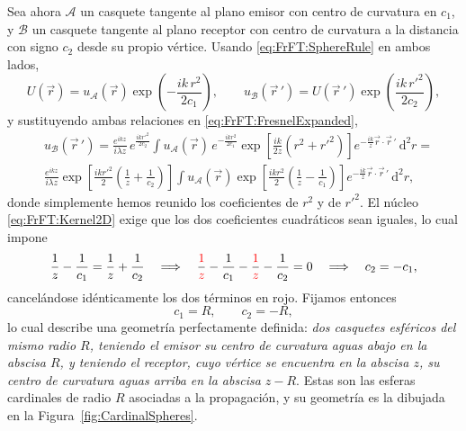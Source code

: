 			Sea ahora $\mathcal{A}$ un casquete tangente al plano emisor con centro de curvatura en $c_{1}$, y $\mathcal{B}$ un casquete tangente al plano receptor con centro de curvatura a la distancia con signo $c_{2}$ desde su propio vértice. Usando \eqref{eq:FrFT:SphereRule} en ambos lados,
			\begin{equation}\label{eq:FrFT:Referring}
				U(\vec{r}) = u_{\mathcal{A}}(\vec{r})\exp\left(-\frac{ik\,r^{2}}{2c_{1}}\right), \qquad u_{\mathcal{B}}(\vec{r}\,') = U(\vec{r}\,')\exp\left(\frac{ik\,r'^{2}}{2c_{2}}\right),
			\end{equation}
			y sustituyendo ambas relaciones en \eqref{eq:FrFT:FresnelExpanded},
			\begin{align*}
				& u_{\mathcal{B}}(\vec{r}\,') = \frac{e^{ikz}}{i\lambda z}\,e^{\frac{ikr'^{2}}{2c_{2}}}\int u_{\mathcal{A}}(\vec{r})\,e^{-\frac{ikr^{2}}{2c_{1}}}\exp\left[\frac{ik}{2z}\left(r^{2}+r'^{2}\right)\right]e^{-\frac{ik}{z}\vec{r}\cdot\vec{r}\,'}\,\mathrm{d}^{2}r = \\
				& \frac{e^{ikz}}{i\lambda z}\exp\left[\frac{ikr'^{2}}{2}\left(\frac{1}{z}+\frac{1}{c_{2}}\right)\right]\int u_{\mathcal{A}}(\vec{r})\exp\left[\frac{ikr^{2}}{2}\left(\frac{1}{z}-\frac{1}{c_{1}}\right)\right]e^{-\frac{ik}{z}\vec{r}\cdot\vec{r}\,'}\,\mathrm{d}^{2}r,
			\end{align*}
			donde simplemente hemos reunido los coeficientes de $r^{2}$ y de $r'^{2}$. El núcleo \eqref{eq:FrFT:Kernel2D} exige que los dos coeficientes cuadráticos sean iguales, lo cual impone
			\begin{equation}\label{eq:FrFT:CardinalCondition}
				\frac{1}{z}-\frac{1}{c_{1}} = \frac{1}{z}+\frac{1}{c_{2}} \quad\Longrightarrow\quad \frac{{\color{red}1}}{{\color{red}z}}-\frac{1}{c_{1}}-\frac{{\color{red}1}}{{\color{red}z}}-\frac{1}{c_{2}}=0 \quad\Longrightarrow\quad c_{2} = -c_{1},
			\end{equation}
			cancelándose idénticamente los dos términos en rojo. Fijamos entonces
			\begin{equation}\label{eq:FrFT:Cardinals}
				c_{1} = R, \qquad c_{2} = -R,
			\end{equation}
			lo cual describe una geometría perfectamente definida: \textit{dos casquetes esféricos del mismo radio $R$, teniendo el emisor su centro de curvatura aguas abajo en la abscisa $R$, y teniendo el receptor, cuyo vértice se encuentra en la abscisa $z$, su centro de curvatura aguas arriba en la abscisa $z-R$}. Estas son las esferas cardinales de radio $R$ asociadas a la propagación, y su geometría es la dibujada en la Figura~\ref{fig:CardinalSpheres}.

